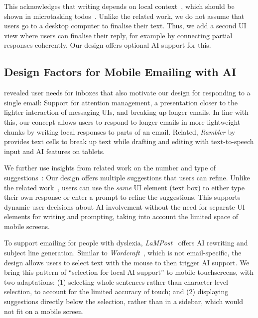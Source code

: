 This acknowledges that writing depends on local context~\cite{salehi2017communicatecontext}, which should be shown in microtasking todos~\cite{august2020microwriting, iqbal2018playwrite}. %
Unlike the related work, we do not assume that users go to a desktop computer to finalise their text. Thus, we add a second UI view where users can finalise their reply, for example by connecting partial responses coherently. Our design offers optional AI support for this.

\subsection{Design Factors for Mobile Emailing with AI}


\citet{Park2019inboxneedfinding} revealed user needs for inboxes that also motivate our design for responding to a single email: Support for attention management, a presentation closer to the lighter interaction of messaging UIs, and breaking up longer emails. In line with this, our concept allows users to respond to longer emails in more lightweight chunks by writing local responses to parts of an email.
Related, \textit{Rambler} by \citet{lin2024rambler} provides text cells to break up text while drafting and editing with text-to-speech input and AI features on tablets. 

We further use insights from related work on the number and type of suggestions~\cite{Buschek2021chi, Dang2023diegetic}: Our design offers multiple suggestions that users can refine. Unlike the related work~\cite{Dang2023diegetic}, users can use the \textit{same} UI element (text box) to either type their own response or enter a prompt to refine the suggestions. This supports dynamic user decisions about AI involvement without the need for separate UI elements for writing and prompting, taking into account the limited space of mobile screens. %

To support emailing for people with dyslexia, \textit{LaMPost}~ \cite{Goodman2022lampost} offers AI rewriting and subject line generation. Similar to \textit{Wordcraft}~\cite{Yuan2022}, which is not email-specific, the design allows users to select text with the mouse to then trigger AI support. We bring this pattern of ``selection for local AI support'' to mobile touchscreens, with two adaptations: (1) selecting whole sentences rather than character-level selection, to account for the limited accuracy of touch; and (2) displaying suggestions directly below the selection, rather than in a sidebar, which would not fit on a mobile screen. 





